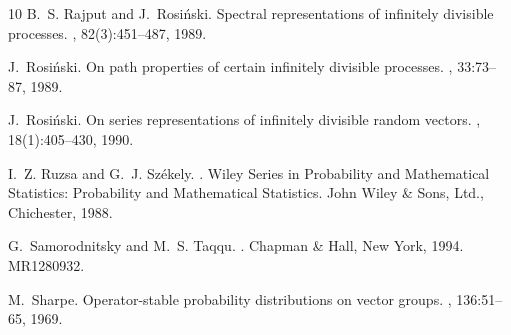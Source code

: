 \documentclass[12pt]{amsart}
\numberwithin{equation}{section}
\numberwithin{figure}{section}
\theoremstyle{plain} \newtheorem{theorem}{Theorem}[section]
\theoremstyle{plain} \newtheorem{proposition}[theorem]{Proposition}
\theoremstyle{plain} \newtheorem{lemma}[theorem]{Lemma}
\theoremstyle{plain} \newtheorem{corollary}[theorem]{Corollary}
\theoremstyle{definition} \newtheorem{definition}[theorem]{Definition}
\theoremstyle{definition} \newtheorem{notation}[theorem]{Notation}
\theoremstyle{remark} \newtheorem{remark}[theorem]{Remark}
\theoremstyle{remark} \newtheorem{example}[theorem]{Example}
\theoremstyle{definition} \newtheorem{assumption}{Assumption}
\begin{document}
\begin{thebibliography}{10}
B.~S. Rajput and J.~Rosi{\'n}ski.
\newblock Spectral representations of infinitely divisible processes.
, 82(3):451--487, 1989.

J.~Rosi{\'n}ski.
\newblock On path properties of certain infinitely divisible processes.
, 33:73--87, 1989.

J.~Rosi{\'n}ski.
\newblock On series representations of infinitely divisible random vectors.
, 18(1):405--430, 1990.

I.~Z. Ruzsa and G.~J. Sz{\'e}kely.
.
\newblock Wiley Series in Probability and Mathematical Statistics: Probability
  and Mathematical Statistics. John Wiley \& Sons, Ltd., Chichester, 1988.

G.~Samorodnitsky and M.~S. Taqqu.
.
\newblock Chapman \& Hall, New York, 1994.
\newblock MR1280932.

M.~Sharpe.
\newblock Operator-stable probability distributions on vector groups.
, 136:51--65, 1969.

\end{thebibliography}
\end{document}
